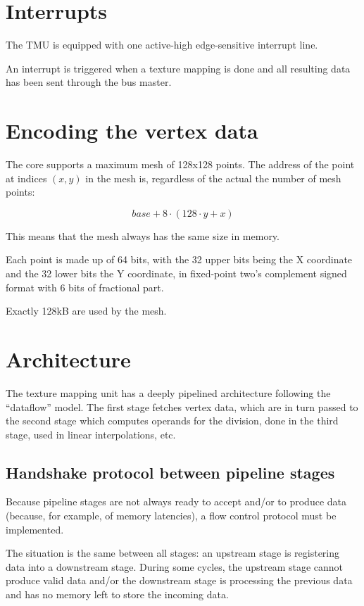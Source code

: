 \documentclass[a4paper,11pt]{article}
\begin{document}
\section{Interrupts}
The TMU is equipped with one active-high edge-sensitive interrupt line.

An interrupt is triggered when a texture mapping is done and all resulting data has been sent through the bus master.

\section{Encoding the vertex data}
The core supports a maximum mesh of 128x128 points. The address of the point at indices $ (x, y) $ in the mesh is, regardless of the actual the number of mesh points:

\begin{equation*}
base + 8 \cdot (128 \cdot y + x)
\end{equation*}

This means that the mesh always has the same size in memory.

Each point is made up of 64 bits, with the 32 upper bits being the X coordinate and the 32 lower bits the Y coordinate, in fixed-point two's complement signed format with 6 bits of fractional part.

Exactly 128kB are used by the mesh.

\section{Architecture}

The texture mapping unit has a deeply pipelined architecture following the ``dataflow'' model. The first stage fetches vertex data, which are in turn passed to the second stage which computes operands for the division, done in the third stage, used in linear interpolations, etc.

\subsection{Handshake protocol between pipeline stages}
Because pipeline stages are not always ready to accept and/or to produce data (because, for example, of memory latencies), a flow control protocol must be implemented.

The situation is the same between all stages: an upstream stage is registering data into a downstream stage. During some cycles, the upstream stage cannot produce valid data and/or the downstream stage is processing the previous data and has no memory left to store the incoming data.
\end{document}
